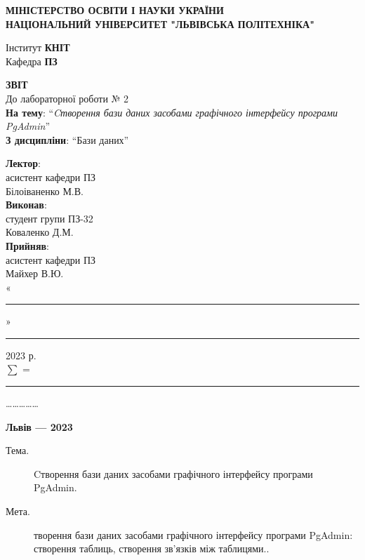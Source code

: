 \documentclass[14pt]{extreport}
\newcommand\subject{Бази даних}
\newcommand\lecturer{асистент кафедри ПЗ\\Білоіваненко М.В.}
\newcommand\teacher{асистент кафедри ПЗ\\Майхер В.Ю.}
\newcommand\mygroup{ПЗ-32}
\newcommand\lab{2}
\newcommand\theme{Cтворення бази даних засобами графічного інтерфейсу програми PgAdmin}
\newcommand\purpose{творення бази даних засобами графічного інтерфейсу програми PgAdmin: створення таблиць, створення зв’язків між таблицями.}
\begin{document}
\begin{normalsize}
	\begin{titlepage}
		\thispagestyle{empty}
		\begin{center}
			\textbf{МІНІСТЕРСТВО ОСВІТИ І НАУКИ УКРАЇНИ\\
				НАЦІОНАЛЬНИЙ УНІВЕРСИТЕТ "ЛЬВІВСЬКА ПОЛІТЕХНІКА"}
		\end{center}
		\begin{flushright}
			Інститут \textbf{КНІТ}\\
			Кафедра \textbf{ПЗ}
		\end{flushright}
		\vspace{200pt}
		\begin{center}
			\textbf{ЗВІТ}\\
			\vspace{10pt}
			До лабораторної роботи № \lab\\
			\textbf{На тему}: “\textit{\theme}”\\
			\textbf{З дисципліни}: “\subject”
		\end{center}
		\vspace{40pt}
		\begin{flushright}
			
			\textbf{Лектор}:\\
			\lecturer\\
			\vspace{10pt}
			\textbf{Виконав}:\\
			
			студент групи \mygroup\\
			Коваленко Д.М.\\
			\vspace{10pt}
			\textbf{Прийняв}:\\
			
			\teacher\\
			
			\vspace{28pt}
			«\rule{1cm}{0.15mm}» \rule{1.5cm}{0.15mm} 2023 р.\\
			$\sum$ = \rule{1cm}{0.15mm}……………\\
			
		\end{flushright}
		\vspace{\fill}
		\begin{center}
			\textbf{Львів — 2023}
		\end{center}
	\end{titlepage}
		
	\begin{description}
		\item[Тема.] \theme.
		\item[Мета.] \purpose.
	\end{description}


\end{normalsize}
\end{document}
